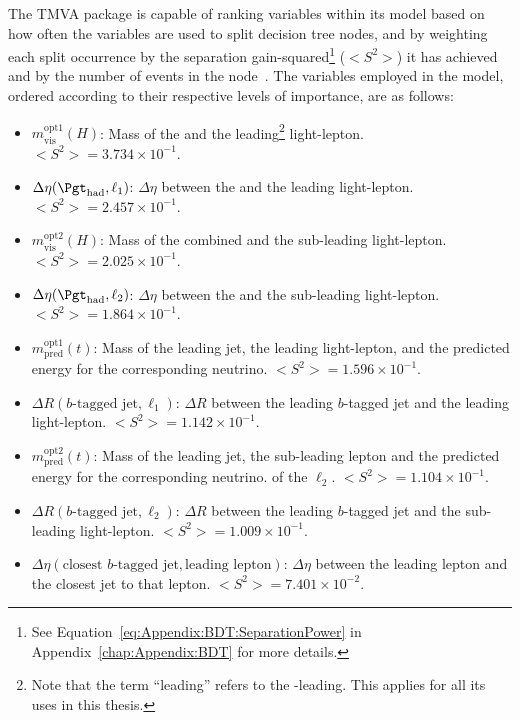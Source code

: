 The TMVA package is capable of ranking variables within its model based on how often the 
variables are used to split decision tree nodes, and by weighting each split occurrence by 
the separation gain-squared\footnote{See Equation~\ref{eq:Appendix:BDT:SeparationPower} 
in Appendix~\ref{chap:Appendix:BDT} for more details.}
 ($<S^{2}>$) it has achieved and by the number of events in the node~\cite{Breiman1984ClassificationAR}.
The variables employed in the model, ordered according to their respective levels of importance, are as follows:
\begin{itemize}
   	\item $m^{\text{opt1}}_{\text{vis}}(H)$: Mass of the \tauhad and the 
		leading\footnote{Note that the term ``leading'' refers to the \pT-leading. This applies for all its uses in this thesis.} light-lepton. %
		 $<S^{2}> = 3.734 \times 10^{-1}$.
   	\item $\Delta \eta(\tauhad, \ell_{1})$: $\Delta \eta$ between the 
		\tauhad and the leading light-lepton. %
		 $<S^{2}> = 2.457 \times 10^{-1}$.
    	\item $m^{\text{opt2}}_{\text{vis}}(H)$: Mass of the combined \tauhad and 
		the sub-leading light-lepton. %
		 $<S^{2}> = 2.025 \times 10^{-1}$.
   	\item $\Delta \eta(\tauhad, \ell_{2})$: $\Delta \eta$ between the 
		\tauhad and the sub-leading light-lepton. %
		 $<S^{2}> = 1.864 \times 10^{-1}$.
    	\item $m^{\text{opt1}}_{\text{pred}}(t)$: Mass of the leading \btagged jet, the leading light-lepton, and the predicted energy for the corresponding neutrino.  %
		 $<S^{2}> = 1.596 \times 10^{-1}$.
    	\item $\Delta R(b\text{-tagged jet}, \ell_{1})$: $\Delta R$ between the leading
		$b$-tagged jet and the leading light-lepton. %
		 $<S^{2}> = 1.142 \times 10^{-1}$.
    	\item $m^{\text{opt2}}_{\text{pred}}(t)$: Mass of the leading \btagged jet, the sub-leading lepton and the predicted energy for the corresponding neutrino.
		of the $\ell_{2}$. %
		 $<S^{2}> = 1.104 \times 10^{-1}$.
	\item $\Delta R(b\text{-tagged jet}, \ell_{2})$: $\Delta R$ between the  leading
		$b$-tagged jet and the sub-leading light-lepton.%
		 $<S^{2}> = 1.009 \times 10^{-1}$.
    	\item $\Delta \eta(\text{closest }b\text{-tagged jet}, \text{leading lepton})$: 
		$\Delta \eta$ between the leading lepton and the closest \btagged 
		jet to that lepton.%
		 $<S^{2}> = 7.401 \times 10^{-2}$.
\end{itemize}
